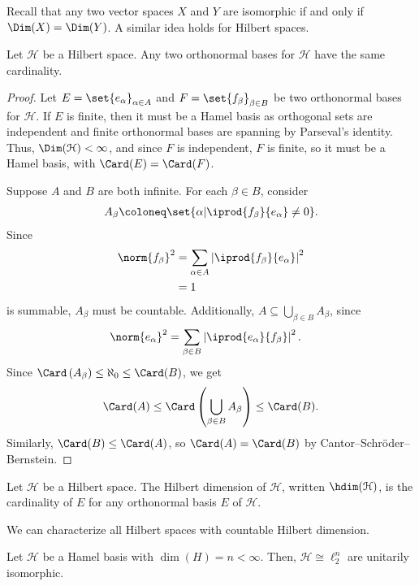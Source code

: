 \documentclass[10pt]{mypackage}
\begin{document}
Recall that any two vector spaces $X$ and $Y$ are isomorphic if and only if $\Dim(X) = \Dim(Y)$. A similar idea holds for Hilbert spaces.
\begin{proposition}
Let $\mathcal{H}$ be a Hilbert space. Any two orthonormal bases for $\mathcal{H}$ have the same cardinality.
\end{proposition}
\begin{proof}
  Let $E = \set{e_{\alpha}}_{\alpha \in A}$ and $F = \set{f_{\beta}}_{\beta \in B}$ be two orthonormal bases for $\mathcal{H}$. If $E$ is finite, then it must be a Hamel basis as orthogonal sets are independent and finite orthonormal bases are spanning by Parseval's identity. Thus, $\Dim(\mathcal{H}) < \infty$, and since $F$ is independent, $F$ is finite, so it must be a Hamel basis, with $\Card(E) = \Card(F)$.\newline

  Suppose $A$ and $B$ are both infinite. For each $\beta \in B$, consider
  \begin{align*}
    A_{\beta} \coloneq \set{\alpha | \iprod{f_{\beta}}{e_{\alpha}} \neq 0}.
  \end{align*}
  Since
  \begin{align*}
    \norm{f_{\beta}}^2 &= \sum_{\alpha \in A} \left\vert \iprod{f_{\beta}}{e_{\alpha}} \right\vert^2\\
                       &= 1
  \end{align*}
  is summable, $A_{\beta}$ must be countable. Additionally, $A\subseteq \bigcup_{\beta \in B}A_{\beta}$, since
  \begin{align*}
    \norm{e_{\alpha}}^2 &= \sum_{\beta \in B}\left\vert \iprod{e_{\alpha}}{f_{\beta}} \right\vert^2.
  \end{align*}
  Since $\Card\left(A_{\beta}\right) \leq \aleph_0\leq \Card(B)$, we get
  \begin{align*}
    \Card(A) \leq \Card\left(\bigcup_{\beta \in B}A_{\beta}\right)\leq \Card(B).
  \end{align*}
  Similarly, $\Card(B) \leq \Card(A)$, so $\Card(A) = \Card(B)$ by Cantor--Schröder--Bernstein.
\end{proof}
\begin{definition}
  Let $\mathcal{H}$ be a Hilbert space. The Hilbert dimension of $\mathcal{H}$, written $\hdim(\mathcal{H})$, is the cardinality of $E$ for any orthonormal basis $E$ of $\mathcal{H}$.
\end{definition}
We can characterize all Hilbert spaces with countable Hilbert dimension.
\begin{proposition}
  Let $\mathcal{H}$ be a Hamel basis with $\dim(H) = n < \infty$. Then, $\mathcal{H} \cong \ell_2^{n}$ are unitarily isomorphic.
\end{proposition}
\end{document}

